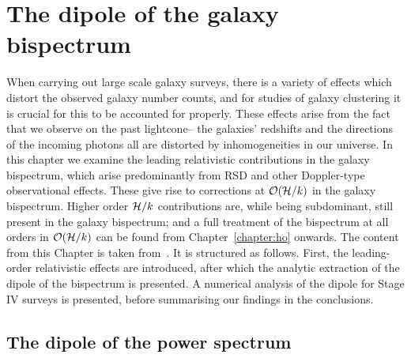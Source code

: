 
\chapter{The dipole of the galaxy bispectrum}
\label{chapter:dipole}

When carrying out large scale galaxy surveys, there is a variety of effects which distort the observed galaxy number counts, and for studies of galaxy clustering it is crucial for this to be accounted for properly. These effects arise from the fact that we observe on the past lightcone-- the galaxies' redshifts and the directions of the incoming photons all are distorted by inhomogeneities in our universe. In this chapter we examine the leading relativistic contributions in the galaxy bispectrum, which arise predominantly from RSD and other Doppler-type observational effects. These give rise to corrections at $\mathcal{O}(\mathcal{H}/k)$ in the galaxy bispectrum. Higher order $\mathcal{H}/k$ contributions are, while being subdominant, still present in the galaxy bispectrum; and a full treatment of the bispectrum at all orders in $\mathcal{O}(\mathcal{H}/k)$ can be found from Chapter~\ref{chapter:ho} onwards. The content from this Chapter is taken from~\cite{Clarkson:2018dwn}. It is structured as follows. First, the leading-order relativistic effects are introduced, after which the analytic extraction of the dipole of the bispectrum is presented. A numerical analysis of the dipole for Stage IV surveys is presented, before summarising our findings in the conclusions. 

\section{The dipole of the power spectrum}

